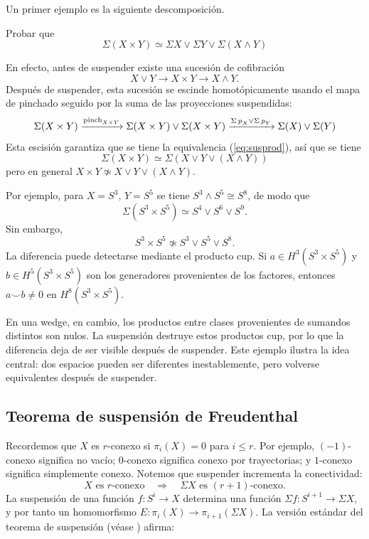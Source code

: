 Un primer ejemplo es la siguiente descomposición.
\begin{ejer}
Probar que
\begin{equation}\label{eq:susprod}
    \Sigma(X\times Y)\simeq \Sigma X\vee\Sigma Y\vee\Sigma(X\wedge Y)
\end{equation}
\end{ejer}
\begin{sol}
En efecto, antes de suspender existe una sucesión de cofibración
\[
X\vee Y\longrightarrow X\times Y\longrightarrow X\wedge Y.
\]
Después de suspender, esta sucesión se escinde homotópicamente usando el mapa de pinchado seguido por la suma de las proyecciones suspendidas:
\[
\Sigma(X \times Y) \xrightarrow{\operatorname{pinch}_{X\times Y}} \Sigma(X \times Y) \vee \Sigma(X \times Y) \xrightarrow{{\Sigma\operatorname{\textit{p}}_X} \vee{\Sigma\operatorname{\textit{p}}_Y}} \Sigma(X) \vee \Sigma(Y)
\]
Esta escisión garantiza que se tiene la equivalencia (\ref{eq:susprod}), así que se tiene
\[
\Sigma(X\times Y)\simeq \Sigma( X\vee Y\vee(X\wedge Y))
\]
pero en general $X\times Y \not\simeq  X\vee Y\vee(X\wedge Y)$.
\end{sol}

Por ejemplo, para $X=S^3,\,Y=S^5$ se tiene \(S^3\wedge S^5\cong S^8\), de modo que
\[
\Sigma(S^3\times S^5)\simeq S^4\vee S^6\vee S^9.
\]
Sin embargo,
\[
S^3\times S^5\not\simeq S^3\vee S^5\vee S^8.
\]
La diferencia puede detectarse mediante el producto cup. Si \(a\in H^3(S^3\times S^5)\) y \(b\in H^5(S^3\times S^5)\) son los generadores provenientes de los factores, entonces $a\smile b\ne0$ en $ H^8(S^3\times S^5)$.

En una wedge, en cambio, los productos entre clases provenientes de sumandos distintos son nulos. La suspensión destruye estos productos cup, por lo que la diferencia deja de ser visible después de suspender.
Este ejemplo ilustra la idea central: dos espacios pueden ser diferentes inestablemente, pero volverse equivalentes después de suspender.

\subsection{Teorema de suspensión de Freudenthal}

Recordemos que \(X\) es \(r\)-conexo si \(\pi_i(X)=0\) para \(i\le r\). Por ejemplo, \((-1)\)-conexo significa no vacío; \(0\)-conexo significa conexo por trayectorias; y \(1\)-conexo significa simplemente conexo.
Notemos que suspender incrementa la conectividad:
\[
X\text{ es }r\text{-conexo}\quad\Longrightarrow\quad \Sigma X\text{ es }(r+1)\text{-conexo}.
\]
La suspensión de una función \(f\colon S^i\to X\) determina una función
\(
\Sigma f\colon S^{i+1}\longrightarrow\Sigma X,
\)
y por tanto un homomorfismo
\(
E\colon\pi_i(X)\longrightarrow\pi_{i+1}(\Sigma X).
\)
La versión estándar del teorema de suspensión (véase \cite{freudenthal1938}) afirma:


